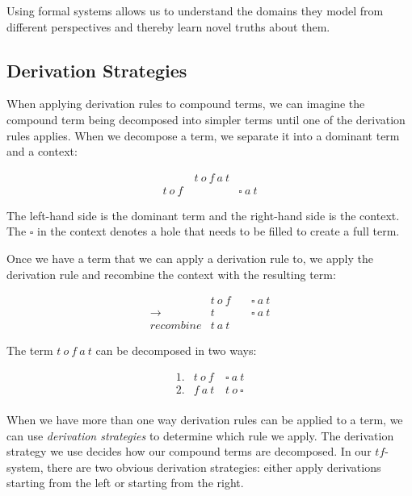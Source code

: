 Using formal systems allows us to understand the domains they model from
different perspectives and thereby learn novel truths about them.

\subsection{Derivation Strategies}

When applying derivation rules to compound terms, we can imagine the 
compound term being decomposed into simpler terms until one of the 
derivation rules applies. When we decompose a term, we separate it into a
dominant term and a context:

\begin{figure}[!h]\label{fig:decomposing}
\[
\begin{array}{lcr}
  & t\ o\ f\ a\ t \\
  t\ o\ f\ && \square\ a\ t 
\end{array}
\]
\end{figure}

The left-hand side is the dominant term and the right-hand side is the context. 
The $\square$ in the context denotes a hole that needs to be filled to create a full term.

Once we have a term that we can apply a derivation rule to, 
we apply the derivation rule and recombine the context with the resulting term:

\[
\begin{array}{rlcr}
      & t\ o\ f\ && \square\ a\ t  \\
  \to & t && \square\ a\ t  \\
  \textit{recombine} & t\ a\ t 
\end{array}
\]

The term $t\ o\ f\ a\ t$ can be decomposed in two ways:

\[
\begin{array}{rlr}
  1. & t\ o\ f\ & \square\ a\ t  \\
  2. & f\ a\ t & t\ o\ \square  \\
\end{array}
\]

When we have more than one way derivation rules can be applied to a term,
we can use \emph{derivation strategies} to determine which rule we apply.
The derivation strategy we use decides how our compound terms are decomposed.
In our $tf$-system, there are two obvious derivation strategies:
either apply derivations starting from the left or starting from the right.

